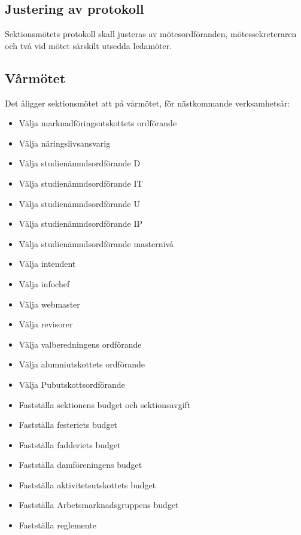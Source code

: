 \documentclass{datateknologsektionen-document}
\begin{document}
    \subsection{Justering av protokoll}
      \label{justeringavprotokoll}
      Sektionsmötets protokoll skall justeras av mötesordföranden, mötessekreteraren och två
      vid mötet särskilt utsedda ledamöter.
    \subsection{Vårmötet}
      Det åligger sektionsmötet att på vårmötet, för nästkommande verksamhetsår:
      \begin{itemize}
        \item Välja marknadföringsutskottets ordförande
        \item Välja näringslivsansvarig
        \item Välja studienämndsordförande D
        \item Välja studienämndsordförande IT
        \item Välja studienämndsordförande U
        \item Välja studienämndsordförande IP
        \item Välja studienämndsordförande masternivå
        \item Välja intendent
	\item Välja infochef
	\item Välja webmaster
        \item Välja revisorer
        \item Välja valberedningens ordförande
        \item Välja alumniutskottets ordförande
        \item Välja Pubutskottsordförande
        \item Fastställa sektionens budget och sektionsavgift
        \item Fastställa festeriets budget
        \item Fastställa fadderiets budget
        \item Fastställa damföreningens budget
        \item Fastställa aktivitetsutskottets budget
        \item Fastställa Arbetsmarknadsgruppens budget
        \item Fastställa reglemente
      \end{itemize}
\end{document}
